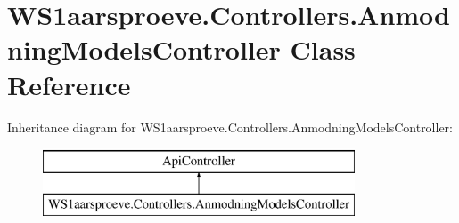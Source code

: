 \hypertarget{class_w_s1aarsproeve_1_1_controllers_1_1_anmodning_models_controller}{}\section{W\+S1aarsproeve.\+Controllers.\+Anmodning\+Models\+Controller Class Reference}
\label{class_w_s1aarsproeve_1_1_controllers_1_1_anmodning_models_controller}
Inheritance diagram for W\+S1aarsproeve.\+Controllers.\+Anmodning\+Models\+Controller\+:\begin{figure}[H]
\begin{center}
\leavevmode
\includegraphics[height=2.000000cm]{class_w_s1aarsproeve_1_1_controllers_1_1_anmodning_models_controller}
\end{center}
\end{figure}

